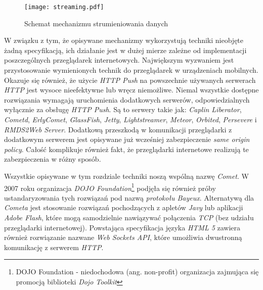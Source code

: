 \documentclass[a4paper,12pt]{article}
\begin{document}
\begin{figure}[ht]
  \begin{center}
    \texttt{[image: streaming.pdf]}
  \end{center}
  \caption{Schemat mechanizmu strumieniowania danych}
  \label{streaming}
\end{figure}

W związku z tym, że opisywane mechanizmy wykorzystują techniki
nieobjęte żadną specyfikacją, ich działanie jest w dużej mierze
zależne od implementacji poszczególnych przeglądarek
internetowych. Największym wyzwaniem jest przystosowanie wymienionych
technik do przeglądarek w urządzeniach mobilnych. Okazuje się również,
że użycie \emph{HTTP Push} na powszechnie używanych serwerach
\emph{HTTP} jest wysoce nieefektywne lub wręcz niemożliwe. Niemal
wszystkie dostępne rozwiązania wymagają uruchomienia dodatkowych
serwerów, odpowiedzialnych wyłącznie za obsługę \emph{HTTP Push}. Są
to serwery takie jak: \emph{Caplin Liberator}, \emph{Cometd},
\emph{ErlyComet}, \emph{GlassFish}, \emph{Jetty},
\emph{Lightstreamer}, \emph{Meteor}, \emph{Orbited}, \emph{Persevere}
i \emph{RMDS2Web Server}\cite{cometmaturity}. Dodatkową przeszkodą w
komunikacji przeglądarki z dodatkowym serwerem jest opisywane już
wcześniej zabezpieczenie \emph{same origin policy}. Całość komplikuje
również fakt, że przeglądarki internetowe realizują te zabezpieczenia
w różny sposób\cite{xssinfo}.

Wszystkie opisywane w tym rozdziale techniki noszą wspólną nazwę
\emph{Comet}\cite{comet}. W 2007 roku organizacja \emph{DOJO
  Foundation}\footnote{DOJO Foundation - niedochodowa
  (ang. non-profit) organizacja zajmująca się promocją biblioteki
  \emph{Dojo Toolkit}\cite{dojo}} podjęła się również próby
ustandaryzowania tych rozwiązań pod nazwą \emph{protokołu
  Bayeux}\cite{bayeux}. Alternatywą dla \emph{Cometa} jest stosowanie
rozwiązań pochodzących z apletów \emph{Javy} lub aplikacji \emph{Adobe
  Flash}, które mogą samodzielnie nawiązywać połączenia \emph{TCP}
(bez udziału przeglądarki internetowej). Powstająca specyfikacja
języka \emph{HTML 5} zawiera również rozwiązanie nazwane \emph{Web
  Sockets API}, które umożliwia dwustronną komunikację z serwerem
\emph{HTTP}\cite{websockets}.
\end{document}

